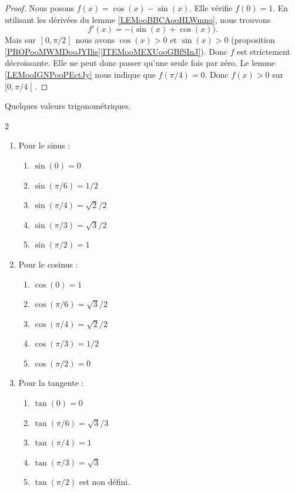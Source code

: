 \begin{proof}
	Nous posons \( f(x)=\cos(x)-\sin(x)\). Elle vérifie \( f(0)=1\). En utilisant les dérivées du lemme \ref{LEMooBBCAooHLWmno}, nous trouvons
	\begin{equation}
		f'(x)=-\big( \sin(x)+\cos(x) \big).
	\end{equation}
	Mais sur \( \mathopen] 0 , \pi/2 \mathclose[\) nous avons \( \cos(x)>0\) et \( \sin(x)>0\) (proposition \ref{PROPooMWMDooJYIlis}\ref{ITEMooMEXUooGBfSInJ}). Donc \( f\) est strictement décroissante. Elle ne peut donc passer qu'une seule fois par zéro. Le lemme \ref{LEMooIGNPooPEctJy} nous indique que \( f(\pi/4)=0\). Donc \( f(x)>0\) sur \( \mathopen[ 0 , \pi/4 \mathclose[\).
\end{proof}

\begin{proposition}		\label{PROPooIBYEooClQttq}
	Quelques valeurs trigonométriques.
	\begin{multicols}{2}
		\begin{enumerate}
			\item
			      Pour le sinus :
			      \begin{enumerate}
				      \item
				            \( \sin(0)=0\)
				      \item
				            \( \sin(\pi/6)=1/2\)
				      \item
				            \( \sin(\pi/4)=\sqrt{ 2 }/2\)
				      \item
				            \( \sin(\pi/3)=\sqrt{ 3 }/2\)
				      \item
				            \( \sin(\pi/2)=1\)
			      \end{enumerate}

			\item
			      Pour le cosinus :
			      \begin{enumerate}
				      \item
				            \( \cos(0)=1\)
				      \item
				            \( \cos(\pi/6)=\sqrt{ 3 }/2\)
				      \item
				            \( \cos(\pi/4)=\sqrt{ 2 }/2\)
				      \item
				            \( \cos(\pi/3)=1/2\)
				      \item
				            \( \cos(\pi/2)=0\)
			      \end{enumerate}
			\item
			      Pour la tangente :
			      \begin{enumerate}
				      \item
				            \( \tan(0)=0\)
				      \item
				            \( \tan(\pi/6)=\sqrt{ 3 }/3\)
				      \item
				            \( \tan(\pi/4)=1\)
				      \item
				            \( \tan(\pi/3)=\sqrt{ 3 }\)
				      \item
				            \( \tan(\pi/2)\) est non défini.
			      \end{enumerate}
		\end{enumerate}
	\end{multicols}
\end{proposition}

